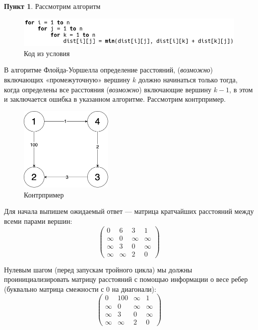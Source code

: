 \documentclass[11pt,a4paper]{scrarticle}
\theoremstyle{definition}
\newtheorem{subtask}{Пункт}
\begin{document}
\begin{subtask}
    Рассмотрим алгоритм
    \begin{figure}[htp]
        \centering
        \includegraphics[width=\textwidth]{static/p3.png}
        \caption{Код из условия}
        \label{fig:code}
    \end{figure}
    \FloatBarrier

    В алгоритме Флойда-Уоршелла определение расстояний, (\textit{возможно}) включающих «промежуточную» вершину $k$ должно начинаться только тогда, когда определены все расстояния (\textit{возможно}) включающие вершину $k - 1$, в этом и заключается ошибка в указанном алгоритме. Рассмотрим контрпример.

    \begin{figure}[htp]
        \centering
        \includegraphics[width=0.4\textwidth]{static/p3-graph.png}
        \caption{Контрпример}
        \label{fig:graph}
    \end{figure}
    \FloatBarrier

    Для начала выпишем ожидаемый ответ — матрица кратчайших расстояний между всеми парами вершин:
    $$\begin{pmatrix}
            0      & 6      & 3      & 1      \\
            \infty & 0      & \infty & \infty \\
            \infty & 3      & 0      & \infty \\
            \infty & \infty & 2      & 0
        \end{pmatrix}
    $$

    Нулевым шагом (перед запускам тройного цикла) мы должны проинициализировать матрицу расстояний с помощью информации о весе ребер (буквально матрица смежности с 0 на диагонали):
    $$\begin{pmatrix}
            0      & 100    & \infty & 1      \\
            \infty & 0      & \infty & \infty \\
            \infty & 3      & 0      & \infty \\
            \infty & \infty & 2      & 0
        \end{pmatrix}
    $$


\end{subtask}
\end{document}
